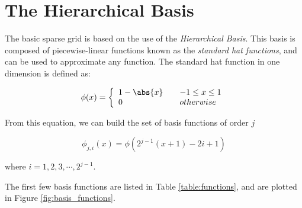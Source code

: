 \section*{The Hierarchical Basis}
The basic sparse grid is based on the use of the \emph{Hierarchical Basis}.  This basis is composed of piecewise-linear functions known as the \emph{standard hat functions}, and can be used to approximate any function.  The standard hat function in one dimension is defined as:

\begin{equation}
\phi(x) = \left\{
        \begin{array}{ll}
            1-\abs{x} & \quad -1 \leq x \leq 1 \\
            0 & \quad otherwise
        \end{array}
    \right.
\end{equation}

From this equation, we can build the set of basis functions of order $j$

\begin{equation}
\phi_{j,i}(x) = \phi(2^{j-1}(x+1) - 2i+1)
\end{equation}

\begin{center}
where $i=1,2,3,\cdots,2^{j-1}$.  
\end{center}

The first few basis functions are listed in Table \ref{table:functions}, and are plotted in Figure \ref{fig:basis_functions}.

